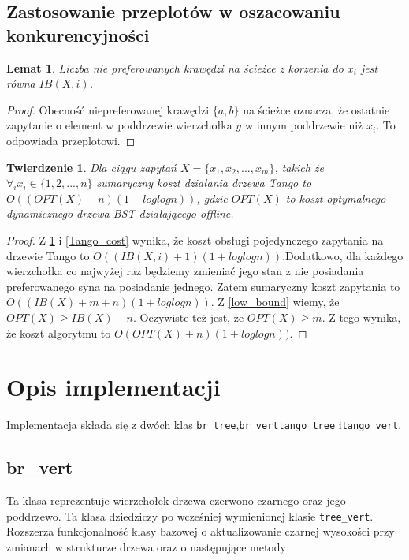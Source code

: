 \documentclass[declaration,shortabstract]{iithesis}
\newcounter{thm}[section]
\theoremstyle{thm}
\theoremstyle{remark}
\theoremstyle{plain}
\newtheorem{theorem}[thm]{Twierdzenie}
\theoremstyle{plain}
\theoremstyle{plain}
\newtheorem{lemma}[thm]{Lemat}
\begin{document}
\subsection{Zastosowanie przeplotów w oszacowaniu konkurencyjności} 
\begin{lemma}
\label{num_switch} 
Liczba nie preferowanych krawędzi na ścieżce z korzenia do \(x_i\) jest równa \(IB(X, i)\). 
\end{lemma} 
\begin{proof} 
Obecność niepreferowanej krawędzi \( \{a, b\}\) na ścieżce oznacza, że ostatnie zapytanie o element w poddrzewie wierzchołka $y$ w innym poddrzewie niż \(x_i\). To odpowiada przeplotowi. 
\end{proof}  

\begin{theorem} 
Dla ciągu zapytań \(X = \{x_1, x_2,..., x_m\}\), takich że \( \forall_i x_i \in \{1, 2, ..., n\}\) sumaryczny koszt działania drzewa Tango to \( O((OPT(X) + n)(1 + loglogn))\), gdzie \(OPT(X)\) to koszt optymalnego dynamicznego drzewa BST działającego offline. 
\end{theorem} 
\begin{proof} 
Z \ref{num_switch} i \ref{Tango_cost} wynika, że koszt obsługi pojedynczego zapytania na drzewie Tango to \(O((IB(X, i)+1)(1+loglogn))\).Dodatkowo, dla każdego wierzchołka co najwyżej raz będziemy zmieniać jego stan z nie posiadania preferowanego syna na posiadanie jednego. Zatem sumaryczny koszt zapytania to \(O((IB(X)+m +n )(1+loglogn))\). Z \ref{low_bound} wiemy, że \(OPT(X) \geq IB(X) - n\). Oczywiste też jest, że \(OPT(X) \geq m\). Z tego wynika, że koszt algorytmu to \(O(OPT(X)+n )(1+loglogn))\). 
\end{proof}  

\section{Opis implementacji} 

Implementacja składa się z dwóch klas \texttt{br\_tree},\texttt{br\_vert}\texttt{tango\_tree} i\texttt{tango\_vert}. 

\subsection{br\_vert}

Ta klasa reprezentuje wierzchołek drzewa czerwono-czarnego oraz jego poddrzewo. Ta klasa dziedziczy po wcześniej wymienionej klasie \texttt{tree\_vert}. Rozszerza funkcjonalność klasy bazowej o aktualizowanie czarnej wysokości przy zmianach w strukturze drzewa oraz o następujące metody
\end{document}
